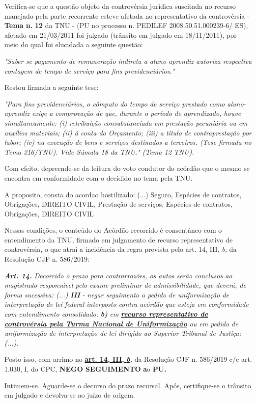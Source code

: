 \documentclass[12pt]{article}
\begin{document}
\justifying
\noindent Verifica-se que a questão objeto da controvérsia jurídica suscitada no recurso manejado pela parte recorrente esteve afetada no representativo da controvérsia - \textbf{Tema n. }\textbf{12} da TNU - (PU no processo n. PEDILEF 2008.50.51.000239-6/ ES),  afetado em 21/03/2011 foi julgado (trânsito em julgado em 18/11/2011), por meio do qual foi elucidada a seguinte questão:

\noindent \textit{"Saber se pagamento de remuneração indireta a aluno aprendiz autoriza respectiva contagem de tempo de serviço para fins previdenciários."}

\noindent Restou firmada a seguinte tese:

\noindent \textit{"Para fins previdenciários, o cômputo do tempo de serviço prestado como aluno-aprendiz exige a comprovação de que, durante o período de aprendizado, houve simultaneamente: (i) retribuição consubstanciada em prestação pecuniária ou em auxílios materiais; (ii) à conta do Orçamento; (iii) a título de contraprestação por labor; (iv) na execução de bens e serviços destinados a terceiros. (Tese firmada no Tema 216/TNU). Vide Súmula 18 da TNU." (Tema 12 TNU).}

\noindent Com efeito, depreende-se da leitura do voto condutor do acórdão que o mesmo se encontra em conformidade com o decidido no  tema pela TNU.

\noindent A proposito, consta do acordao hostilizado: (...) Seguro, Espécies de contratos, Obrigações, DIREITO CIVIL, Prestação de serviços, Espécies de contratos, Obrigações, DIREITO CIVIL

\noindent Nessas condições, o conteúdo do Acórdão recorrido é consentâneo com o entendimento da TNU, firmado em julgamento de recurso representativo de controvérsia, o que atrai a incidência da regra prevista pelo art. 14, III, \textit{b,} da Resolução CJF n. 586/2019:

\noindent \textit{\textbf{Art. 14.}}\textit{ Decorrido o prazo para contrarrazões, os autos serão conclusos ao magistrado responsável pelo exame preliminar de admissibilidade, que deverá, de forma sucessiva: (...) }\textit{\textbf{III }}\textit{- negar seguimento a pedido de uniformização de interpretação de lei federal interposto contra acórdão que esteja em conformidade com entendimento consolidado: }\textit{\textbf{b)}}\textit{ em }\uline{\textit{\textbf{recurso representativo de controvérsia pela Turma Nacional de Uniformização}}}\textit{ ou em pedido de uniformização de interpretação de lei dirigido ao Superior Tribunal de Justiça;(...).}

\noindent Posto isso, com arrimo no \uline{\textbf{art. 14, III, }}\uline{\textit{\textbf{b}}}\textit{,} da Resolução CJF n. 586/2019 c/c art. 1.030, I, do CPC, \textbf{NEGO SEGUIMENTO }\textbf{a}o\textbf{ PU}\textbf{.}

\noindent Intimem-se. Aguarde-se o decurso do prazo recursal. Após, certifique-se o trânsito em julgado e devolva-se ao juízo de origem.
\end{document}
